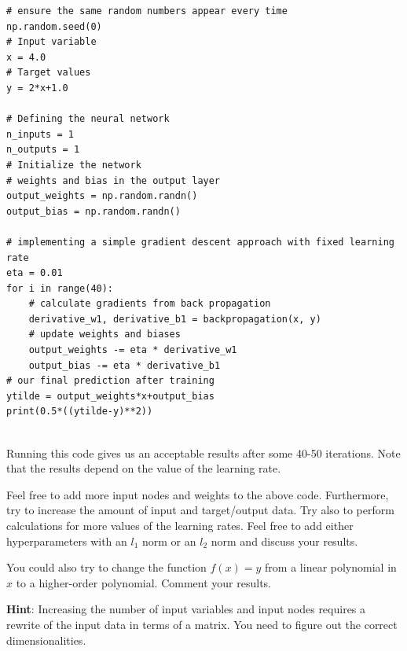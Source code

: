 \documentclass{beamer}
\newenvironment{doconceexercise}{}{}
\newcounter{doconceexercisecounter}
\newcounter{doconce:movie:counter}
\begin{document}
\begin{frame}
\begin{verbatim}
# ensure the same random numbers appear every time
np.random.seed(0)
# Input variable
x = 4.0
# Target values
y = 2*x+1.0

# Defining the neural network
n_inputs = 1
n_outputs = 1
# Initialize the network
# weights and bias in the output layer
output_weights = np.random.randn()
output_bias = np.random.randn()

# implementing a simple gradient descent approach with fixed learning rate
eta = 0.01
for i in range(40):
    # calculate gradients from back propagation
    derivative_w1, derivative_b1 = backpropagation(x, y)
    # update weights and biases
    output_weights -= eta * derivative_w1
    output_bias -= eta * derivative_b1
# our final prediction after training
ytilde = output_weights*x+output_bias
print(0.5*((ytilde-y)**2))


\end{verbatim}

Running this code gives us an acceptable results after some 40-50 iterations. Note that the results depend on the value of the learning rate.
\end{frame}

\begin{frame}

\begin{doconceexercise}

                             

Feel free to add more input nodes and weights to the above
code. Furthermore, try to increase the amount of input and
target/output data. Try also to perform calculations for more values
of the learning rates. Feel free to add either hyperparameters with an
$l_1$ norm or an $l_2$ norm and discuss your results.

You could also try to change the function $f(x)=y$ from a linear polynomial in $x$ to a higher-order polynomial.
Comment your results.

\textbf{Hint}: Increasing the number of input variables and input nodes requires a rewrite of the input data in terms of a matrix. You need to figure out the correct dimensionalities.

\end{doconceexercise}
\end{frame}
\end{document}
